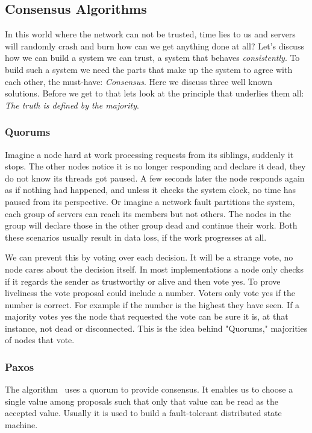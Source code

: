 \subsection{Consensus Algorithms}
In this world where the network can not be trusted, time lies to us and servers will randomly crash and burn how can we get anything done at all? Let's discuss how we can build a system we can trust, a system that behaves \textit{consistently}. To build such a system we need the parts that make up the system to agree with each other, the must-have: \emph{Consensus}. Here we discuss three well known solutions. Before we get to that lets look at the principle that underlies them all: \emph{The truth is defined by the majority}.

\subsubsection*{Quorums}
Imagine a node hard at work processing requests from its siblings, suddenly it stops. The other nodes notice it is no longer responding and declare it dead, they do not know its threads got paused. A few seconds later the node responds again as if nothing had happened, and unless it checks the system clock, no time has paused from its perspective. Or imagine a network fault partitions the system, each group of servers can reach its members but not others. The nodes in the group will declare those in the other group dead and continue their work. Both these scenarios usually result in data loss, if the work progresses at all.

We can prevent this by voting over each decision. It will be a strange vote, no node cares about the decision itself. In most implementations a node only checks if it regards the sender as trustworthy or alive and then vote yes. To prove liveliness the vote proposal could include a number. Voters only vote yes if the number is correct. For example if the number is the highest they have seen. If a majority votes yes the node that requested the vote can be sure it is, at that instance, not dead or disconnected. This is the idea behind "Quorums," majorities of nodes that vote.

\subsubsection*{Paxos}
The \paxos{} algorithm~\cite{paxos} uses a quorum to provide consensus. It enables us to choose a single value among proposals such that only that value can be read as the accepted value. Usually it is used to build a fault-tolerant distributed state machine. 

